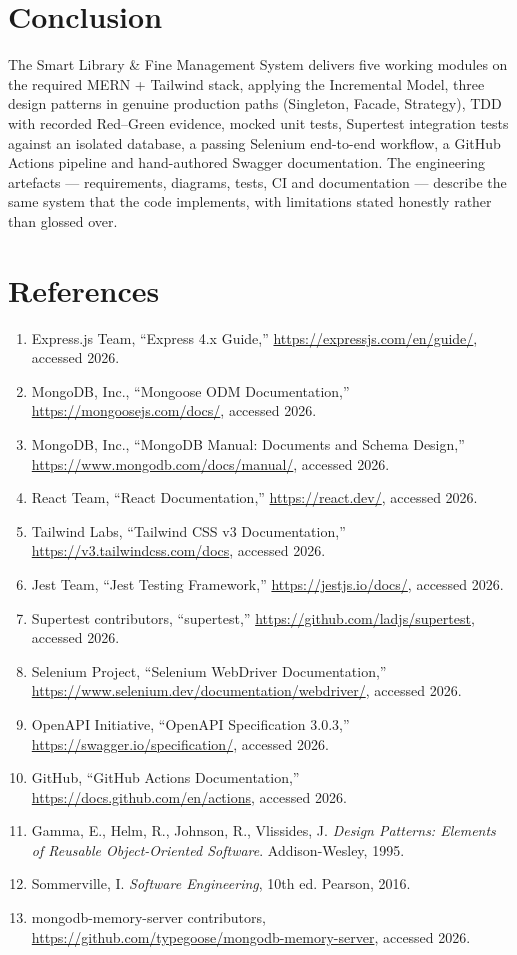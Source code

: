 \documentclass[12pt,a4paper]{article}
\begin{document}
\section{Conclusion}
The Smart Library \& Fine Management System delivers five working modules on
the required MERN + Tailwind stack, applying the Incremental Model, three
design patterns in genuine production paths (Singleton, Facade, Strategy),
TDD with recorded Red--Green evidence, mocked unit tests, Supertest
integration tests against an isolated database, a passing Selenium
end-to-end workflow, a GitHub Actions pipeline and hand-authored Swagger
documentation. The engineering artefacts — requirements, diagrams, tests,
CI and documentation — describe the same system that the code implements,
with limitations stated honestly rather than glossed over.

\section{References}
\begin{enumerate}[leftmargin=1.6em]\small
  \item Express.js Team, ``Express 4.x Guide,'' \url{https://expressjs.com/en/guide/}, accessed 2026.
  \item MongoDB, Inc., ``Mongoose ODM Documentation,'' \url{https://mongoosejs.com/docs/}, accessed 2026.
  \item MongoDB, Inc., ``MongoDB Manual: Documents and Schema Design,'' \url{https://www.mongodb.com/docs/manual/}, accessed 2026.
  \item React Team, ``React Documentation,'' \url{https://react.dev/}, accessed 2026.
  \item Tailwind Labs, ``Tailwind CSS v3 Documentation,'' \url{https://v3.tailwindcss.com/docs}, accessed 2026.
  \item Jest Team, ``Jest Testing Framework,'' \url{https://jestjs.io/docs/}, accessed 2026.
  \item Supertest contributors, ``supertest,'' \url{https://github.com/ladjs/supertest}, accessed 2026.
  \item Selenium Project, ``Selenium WebDriver Documentation,'' \url{https://www.selenium.dev/documentation/webdriver/}, accessed 2026.
  \item OpenAPI Initiative, ``OpenAPI Specification 3.0.3,'' \url{https://swagger.io/specification/}, accessed 2026.
  \item GitHub, ``GitHub Actions Documentation,'' \url{https://docs.github.com/en/actions}, accessed 2026.
  \item Gamma, E., Helm, R., Johnson, R., Vlissides, J. \emph{Design Patterns: Elements of Reusable Object-Oriented Software}. Addison-Wesley, 1995.
  \item Sommerville, I. \emph{Software Engineering}, 10th ed. Pearson, 2016.
  \item mongodb-memory-server contributors, \url{https://github.com/typegoose/mongodb-memory-server}, accessed 2026.
\end{enumerate}
\end{document}
